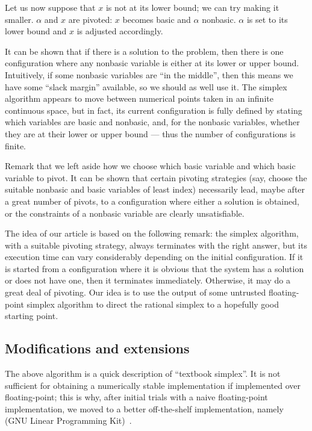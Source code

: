 Let us now suppose that $x$ is not at its lower bound; we can try making it smaller. $\alpha$ and $x$ are pivoted: $x$ becomes basic and $\alpha$ nonbasic. $\alpha$ is set to its lower bound and $x$ is adjusted accordingly.

It can be shown that if there is a solution to the problem, then there is one configuration where any nonbasic variable is either at its lower or upper bound. Intuitively, if some nonbasic variables are ``in the middle'', then this means we have some ``slack margin'' available, so we should as well use it.
The simplex algorithm appears to move between numerical points taken in an infinite continuous space, but in fact, its current configuration is fully defined by stating which variables are basic and nonbasic, and, for the nonbasic variables, whether they are at their lower or upper bound --- thus the number of configurations is finite.

Remark that we left aside how we choose which basic variable and which basic variable to pivot. It can be shown that certain pivoting strategies (say, choose the suitable nonbasic and basic variables of least index) necessarily lead, maybe after a great number of pivots, to a configuration where either a solution is obtained, or the constraints of a nonbasic variable are clearly unsatisfiable.

The idea of our article is based on the following remark: the simplex algorithm, with a suitable pivoting strategy, always terminates with the right answer, but its execution time can vary considerably depending on the initial configuration. If it is started from a configuration where it is obvious that the system has a solution or does not have one, then it terminates immediately. Otherwise, it may do a great deal of pivoting. Our idea is to use the output of some untrusted floating-point simplex algorithm to direct the rational simplex to a hopefully good starting point.

\subsection{Modifications and extensions}
\label{part:extensions}
The above algorithm is a quick description of ``textbook simplex''. It is not sufficient for obtaining a numerically stable implementation if implemented over floating-point; this is why, after initial trials with a naive floating-point implementation, we moved to a better off-the-shelf implementation, namely  (GNU Linear Programming Kit)~\cite{GLPK}.

